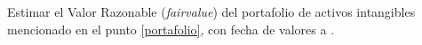 Estimar el Valor Razonable (\textit{\gls{fairvalue}}) del portafolio de activos intangibles mencionado en el punto \ref{portafolio}, con fecha de valores a \fechaValores.